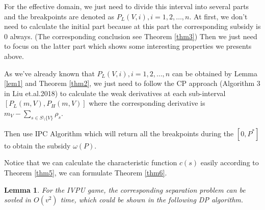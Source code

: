 \documentclass[UTF8]{article}
\newtheorem{lem}{\hspace{2em}Lemma}
\begin{document}
For the effective domain, we just need to divide this interval into several parts and the breakpoints are denoted as $P_L(V,i), i = 1,2,\ldots,n$.  At first, we don't need to calculate the initial part because at this part the corresponding subsidy is 0 always. (The corresponding conclusion see Theorem \ref{thm3}) Then we just need to focus on the latter part which shows some interesting properties we presents above.

As we've already known that $P_L(V,i), i = 1,2,\ldots,n$ can be obtained by Lemma \ref{lem1} and Theorem \ref{thm2}, we just need to follow the CP approach (Algorithm 3 in Liu et.al.2018) to calculate the weak derivatives at each sub-interval $[P_L(m,V),P_H(m,V)]$ where the corresponding derivative is $m_V-\sum_{s\in S\setminus\{V\}} \rho_s$.

Then use IPC Algorithm which will return all the breakpoints during the $[0, P^*]$ to obtain the subsidy $\omega(P)$.

Notice that we can calculate the characteristic function $c(s)$ easily according to Theorem \ref{thm5}, we can formulate Theorem \ref{thm6}.

\begin{lem}\label{lem5}
  For the IVPU game, the corresponding separation problem can be sovled in $O(v^2)$ time, which could be shown in the following DP algorithm.
\end{lem}
\end{document}
